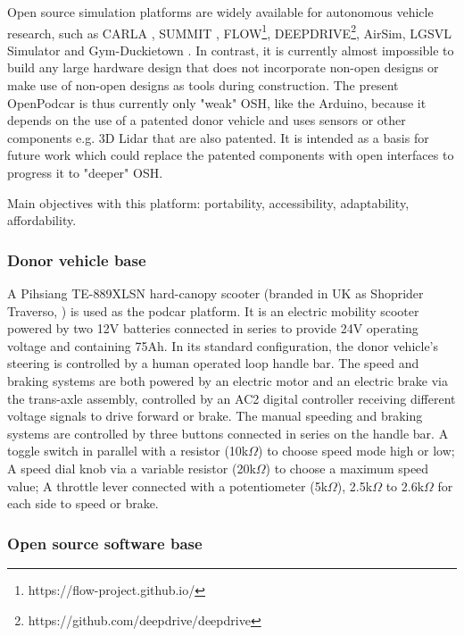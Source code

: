 \documentclass[a4paper]{article}
\begin{document}
Open source simulation platforms are widely available for autonomous vehicle research, such as CARLA \cite{dosovitskiy2017carla}, SUMMIT \cite{cai2020summit}, FLOW\footnote{https://flow-project.github.io/}, DEEPDRIVE\footnote{https://github.com/deepdrive/deepdrive}, AirSim\cite{shah2017airsim}, LGSVL Simulator \cite{rong2020lgsvl} and Gym-Duckietown \cite{chevalier-boisvert2018duckietown}. In contrast, it is currently almost impossible to build any large hardware design that does not incorporate non-open designs or make use of non-open designs as tools during construction. The present OpenPodcar is thus currently only "weak" OSH, like the Arduino, because it depends on the use of a patented donor vehicle and uses sensors or other components e.g. 3D Lidar that are also patented. It is intended as a basis for future work which could replace the patented components with open interfaces to progress it to "deeper" OSH.


Main objectives with this platform: portability,  accessibility, adaptability, affordability.

\subsubsection{Donor vehicle base}    
A Pihsiang TE-889XLSN hard-canopy scooter (branded in UK as Shoprider Traverso, \cite{shoprider2006}) is used as the podcar platform. It is an electric mobility scooter powered by two 12V batteries connected in series to provide 24V operating voltage and containing 75Ah. In its standard configuration, the donor vehicle’s steering is controlled by a human operated loop handle bar. The speed and braking systems are both powered by an electric motor and an electric brake via the trans-axle assembly, controlled by an AC2 digital controller receiving different voltage signals to drive forward or brake. The manual speeding and braking systems are controlled by three buttons connected in series on the handle bar. A toggle switch in parallel with a resistor (10k$\Omega$) to choose speed mode high or low; A speed dial knob via a variable resistor (20k$\Omega$) to choose a maximum speed value; A throttle lever connected with a potentiometer (5k$\Omega$), 2.5k$\Omega$ to 2.6k$\Omega$ for each side to speed or brake. 

\subsubsection{Open source software base}
\end{document}
